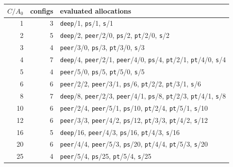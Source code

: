 \begin{tabular}{rrl}
\toprule
$C/A_0$ & configs & evaluated allocations \\
\midrule
1 & 3 & \footnotesize \texttt{deep}/1, \texttt{ps}/1, \texttt{s}/1 \\
2 & 5 & \footnotesize \texttt{deep}/2, \texttt{peer}/2/0, \texttt{ps}/2, \texttt{pt}/2/0, \texttt{s}/2 \\
3 & 4 & \footnotesize \texttt{peer}/3/0, \texttt{ps}/3, \texttt{pt}/3/0, \texttt{s}/3 \\
4 & 7 & \footnotesize \texttt{deep}/4, \texttt{peer}/2/1, \texttt{peer}/4/0, \texttt{ps}/4, \texttt{pt}/2/1, \texttt{pt}/4/0, \texttt{s}/4 \\
5 & 4 & \footnotesize \texttt{peer}/5/0, \texttt{ps}/5, \texttt{pt}/5/0, \texttt{s}/5 \\
6 & 6 & \footnotesize \texttt{peer}/2/2, \texttt{peer}/3/1, \texttt{ps}/6, \texttt{pt}/2/2, \texttt{pt}/3/1, \texttt{s}/6 \\
8 & 7 & \footnotesize \texttt{deep}/8, \texttt{peer}/2/3, \texttt{peer}/4/1, \texttt{ps}/8, \texttt{pt}/2/3, \texttt{pt}/4/1, \texttt{s}/8 \\
10 & 6 & \footnotesize \texttt{peer}/2/4, \texttt{peer}/5/1, \texttt{ps}/10, \texttt{pt}/2/4, \texttt{pt}/5/1, \texttt{s}/10 \\
12 & 6 & \footnotesize \texttt{peer}/3/3, \texttt{peer}/4/2, \texttt{ps}/12, \texttt{pt}/3/3, \texttt{pt}/4/2, \texttt{s}/12 \\
16 & 5 & \footnotesize \texttt{deep}/16, \texttt{peer}/4/3, \texttt{ps}/16, \texttt{pt}/4/3, \texttt{s}/16 \\
20 & 6 & \footnotesize \texttt{peer}/4/4, \texttt{peer}/5/3, \texttt{ps}/20, \texttt{pt}/4/4, \texttt{pt}/5/3, \texttt{s}/20 \\
25 & 4 & \footnotesize \texttt{peer}/5/4, \texttt{ps}/25, \texttt{pt}/5/4, \texttt{s}/25 \\
\bottomrule
\end{tabular}
